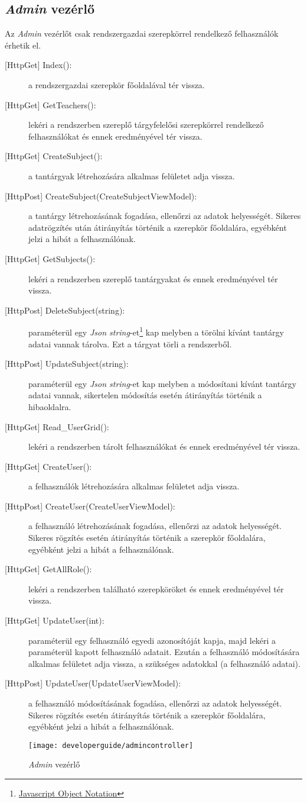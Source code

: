 \subsection{\emph{Admin} vezérlő}
Az \emph{Admin} vezérlőt csak rendszergazdai szerepkörrel rendelkező felhasználók érhetik el.
\begin{description}
	\item[{[HttpGet]} Index():] a rendszergazdai szerepkör főoldalával tér vissza.
	\item[{[HttpGet]} GetTeachers():] lekéri a rendszerben szereplő tárgyfelelősi szerepkörrel rendelkező felhasználókat és ennek eredményével tér vissza.
	\item[{[HttpGet]} CreateSubject():] a tantárgyak létrehozására alkalmas felületet adja vissza.
	\item[{[HttpPost]} CreateSubject(CreateSubjectViewModel):] a tantárgy létrehozásának fogadása, ellenőrzi az adatok helyességét. Sikeres adatrögzítés után átirányítás történik a szerepkör főoldalára, egyébként jelzi a hibát a felhasználónak.
	\item[{[HttpGet]} GetSubjects():] lekéri a rendszerben szereplő tantárgyakat és ennek eredményével tér vissza.
	\item[{[HttpPost]} DeleteSubject(string):] paraméterül egy \emph{Json string}-et\footnote{\href{https://www.json.org/json-en.html}{Javascript Object Notation}} kap melyben a törölni kívánt tantárgy adatai vannak tárolva. Ezt a tárgyat törli a rendszerből.
	\item[{[HttpPost]} UpdateSubject(string):] paraméterül egy \emph{Json string}-et kap melyben a módosítani kívánt tantárgy adatai vannak, sikertelen módosítás esetén átirányítás történik a hibaoldalra.
	\item[{[HttpGet]} Read\_UserGrid():] lekéri a rendszerben tárolt felhasználókat és ennek eredményével tér vissza.
	\item[{[HttpGet]} CreateUser():] a felhasználók létrehozására alkalmas felületet adja vissza.
	\item[{[HttpPost]} CreateUser(CreateUserViewModel):] a felhasználó létrehozásának fogadása, ellenőrzi az adatok helyességét. Sikeres rögzítés esetén átirányítás történik a szerepkör főoldalára, egyébként jelzi a hibát a felhasználónak.
	\item[{[HttpGet]} GetAllRole():] lekéri a rendszerben található szerepköröket és ennek eredményével tér vissza.
	\item[{[HttpGet]} UpdateUser(int):] paraméterül egy felhasználó egyedi azonosítóját kapja, majd lekéri a paraméterül kapott felhasználó adatait. Ezután a felhasználó módosítására alkalmas felületet adja vissza, a szükséges adatokkal (a felhasználó adatai).
	\item[{[HttpPost]} UpdateUser(UpdateUserViewModel):] a felhasználó módosításának fogadása, ellenőrzi az adatok helyességét. Sikeres rögzítés esetén átirányítás történik a szerepkör főoldalára, egyébként jelzi a hibát a felhasználónak.
\end{description}
\begin{figure}[H]
	\centering
	\texttt{[image: developerguide/admincontroller]}
	\caption{\emph{Admin} vezérlő}
	\label{fig:admincontroller}
\end{figure}
